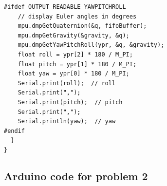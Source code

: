 \documentclass[conference]{IEEEtran}
\begin{document}
\begin{lstlisting}[style=Arduino]
#ifdef OUTPUT_READABLE_YAWPITCHROLL
    // display Euler angles in degrees
    mpu.dmpGetQuaternion(&q, fifoBuffer);
    mpu.dmpGetGravity(&gravity, &q);
    mpu.dmpGetYawPitchRoll(ypr, &q, &gravity);
    float roll = ypr[2] * 180 / M_PI;
    float pitch = ypr[1] * 180 / M_PI;
    float yaw = ypr[0] * 180 / M_PI;
    Serial.print(roll);  // roll
    Serial.print(",");
    Serial.print(pitch);  // pitch
    Serial.print(",");
    Serial.println(yaw);  // yaw
#endif
  }
}
\end{lstlisting}

\subsection{Arduino code for problem 2}
\end{document}
